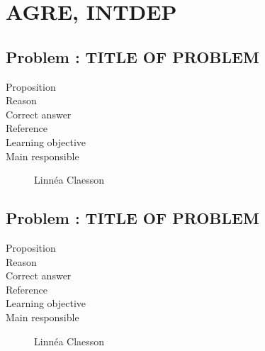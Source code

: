 \documentclass[10pt,a4paper]{article}
\begin{document}
\section*{AGRE, INTDEP}
\subsection*{Problem : TITLE OF PROBLEM}
\begin{description}
\item[Proposition] 
\item[Reason] 
\item[Correct answer]
\item[Reference]
\item[Learning objective]
\item[Main responsible] Linn\'ea Claesson
\end{description}

\subsection*{Problem : TITLE OF PROBLEM}
\begin{description}
\item[Proposition] 
\item[Reason] 
\item[Correct answer]
\item[Reference]
\item[Learning objective]
\item[Main responsible] Linn\'ea Claesson
\end{description}
\end{document}
